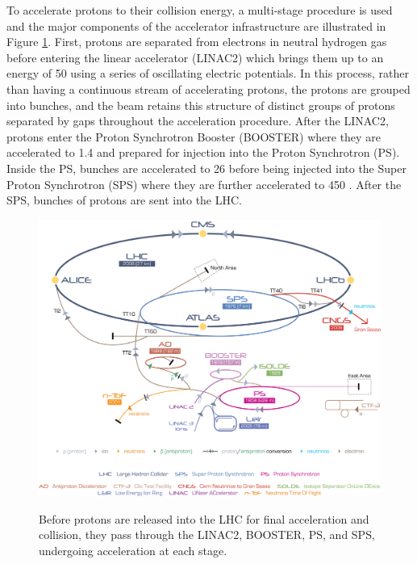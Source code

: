To accelerate protons to their collision energy,
 a multi-stage procedure is used and 
 the major components of the accelerator infrastructure
 are illustrated in Figure \ref{fig:lhc_complex}.
First, protons are separated from
 electrons in neutral hydrogen gas before
 entering the linear accelerator (LINAC2)
 which brings them up to an energy of 50 \MeV
 using a series of oscillating electric potentials.
In this process, rather than having a continuous 
 stream of accelerating protons, the protons
 are grouped into bunches, and the beam
 retains this structure
 of distinct groups of protons separated by gaps
 throughout the acceleration procedure.
After the LINAC2, protons enter the Proton
 Synchrotron Booster (BOOSTER) where
 they are accelerated to 1.4 \GeV and 
 prepared for injection into the Proton Synchrotron (PS).
Inside the PS, bunches are accelerated to
 26 \GeV before being injected into the
 Super Proton Synchrotron (SPS) where they 
 are further accelerated to 450 \GeV.
After the SPS, bunches of protons are sent into
 the LHC.

\begin{figure}[htb]
\caption[The LCH accelerator complex at CERN]{
 Before protons are released into the LHC
  for final acceleration and collision, they pass through
  the LINAC2, BOOSTER, PS, and SPS, 
  undergoing acceleration %
  at each stage.
 }
\includegraphics[width=\textwidth]{pdfs/experiment/cern_accelerator_complex.jpg}
\label{fig:lhc_complex}
\end{figure}


